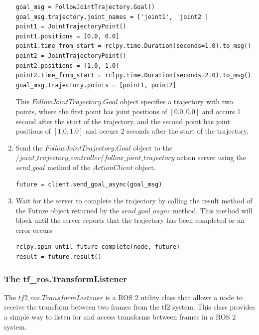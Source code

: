\documentclass[12pt,oneside]{article}
\begin{document}
\begin{enumerate}
\begin{tcolorbox}[]
\begin{verbatim}
goal_msg = FollowJointTrajectory.Goal()
goal_msg.trajectory.joint_names = ['joint1', 'joint2']
point1 = JointTrajectoryPoint()
point1.positions = [0.0, 0.0]
point1.time_from_start = rclpy.time.Duration(seconds=1.0).to_msg()
point2 = JointTrajectoryPoint()
point2.positions = [1.0, 1.0]
point2.time_from_start = rclpy.time.Duration(seconds=2.0).to_msg()
goal_msg.trajectory.points = [point1, point2]
\end{verbatim}
\end{tcolorbox}
This $FollowJointTrajectory.Goal$ object specifies a trajectory with two points, where the first point has joint positions of $[0.0, 0.0]$ and occurs 1 second after the start of the trajectory, and the second point has joint positions of $[1.0, 1.0]$ and occurs 2 seconds after the start of the trajectory.
\item Send the $FollowJointTrajectory.Goal$ object to the \\ $/joint\_trajectory\_controller/follow\_joint\_trajectory$ action server using the \\ $send\_goal$ method of the $ActionClient$ object.
\begin{tcolorbox}[]
\begin{verbatim}
future = client.send_goal_async(goal_msg)
\end{verbatim}
\end{tcolorbox}
\item Wait for the server to complete the trajectory by calling the result method of the Future object returned by the $send\_goal\_async$ method. This method will block until the server reports that the trajectory has been completed or an error occurs
\begin{tcolorbox}[]
\begin{verbatim}
rclpy.spin_until_future_complete(node, future)
result = future.result()
\end{verbatim}
\end{tcolorbox}
\end{enumerate}

\subsubsection{The tf\_ros.TransformListener}\label{ros2-transform-listener}
The $tf2\_ros.TransformListener$ is a ROS 2 utility class that allows a node to receive the transform between two frames from the tf2 system. This class provides a simple way to listen for and access transforms between frames in a ROS 2 system.
\end{document}
